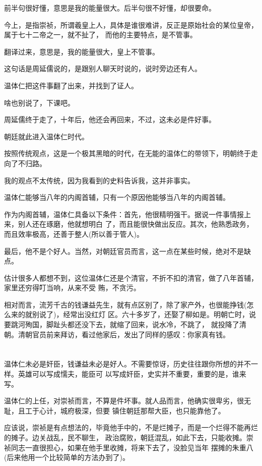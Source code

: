 \documentclass[11pt,a4paper,onecolumn]{article}
\begin{document}
前半句很好懂，意思是我的能量很大。后半句很不好懂，却很要命。

今上，是指崇祯，所谓羲皇上人，具体是谁很难讲，反正是原始社会的某位皇帝，属于七十二帝之一，就不扯了，
而他的主要特点，是不管事。

翻译过来，意思是，我的能量很大，皇上不管事。

这句话是周延儒说的，是跟别人聊天时说的，说时旁边还有人。

温体仁把这件事翻了出来，并找到了证人。

啥也别说了，下课吧。

周延儒终于走了，十年后，他还会再回来，不过，这未必是件好事。

朝廷就此进入温体仁时代。

按照传统观点，这是一个极其黑暗的时代，在无能的温体仁的带领下，明朝终于走向了不归路。

我的观点不太传统，因为我看到的史料告诉我，这并非事实。

温体仁能够当八年的内阁首辅，只有一个原因\myrule 他能够当八年的内阁首辅。

作为内阁首辅，温体仁具备以下条件：首先，他很精明强干。据说一件事情报上来，别人还在琢磨，他就想明白
了，而且能很快做出反应。其次，他熟悉政务，而且效率极高，还善于整人(所以善于管人)。

最后，他不是个好人。当然，对朝廷官员而言，这一点在某些时候，绝对不是缺点。

估计很多人都想不到，这位温体仁还是个清官，不折不扣的清官，做了八年首辅，家里还穷得叮当响，从来不受
贿，不贪污。

相对而言，流芳千古的钱谦益先生，就有点区别了，除了家产外，也很能挣钱(怎么来的就别说了)，经常出没红灯
区。六十多岁了，还娶了柳如是。明朝亡时，说要跳河殉国，脚趾头都还没下去，就缩了回来，说水冷，不跳了，
就投降了清朝。清朝官员前来拜访，看过他家后，发出了同样的感叹：你家真有钱。

\section[\thesection]{}

温体仁未必是奸臣，钱谦益未必是好人。不需要惊讶，历史往往跟你所想的并不一样。英雄可以写成懦夫，能臣可
以写成奸臣，史实并不重要，重要的是，谁来写。

温体仁的上任，对崇祯而言，不算是件坏事。就人品而言，他确实很卑劣，很无耻，且工于心计，城府极深，但要
镇住朝廷那帮大臣，也只能靠他了。

应该说，崇祯是有点想法的，毕竟他手中的，不是烂摊子，而是一个烂得不能再烂的摊子。边关战乱，民不聊生，
政治腐败，朝廷混乱，如此下去，只能收摊。崇祯同志一直很担心，如果在他手里收摊，将来下去了，没脸见当年
摆摊的朱重八(后来他用一个比较简单的方法办到了)。
\end{document}
